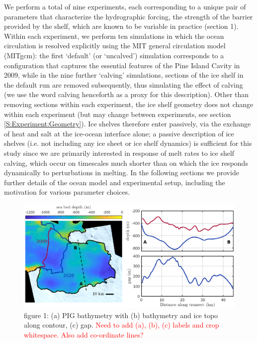 \documentclass[draft]{agujournal2019}
\newcommand{\red}[1]{\textcolor{red}{#1}}
\begin{document}
We perform a total of nine experiments, each corresponding to a unique pair of parameters that characterize the hydrographic forcing, the strength of the barrier provided by the shelf, which are known to be variable in practice (section 1). Within each experiment, we perform ten simulations in which the ocean circulation is resolved explicitly using the MIT general circulation model (MITgcm): the first `default' (or `uncalved') simulation  corresponds to a configuration that captures the essential features of the Pine Island Cavity in 2009, while in the nine further `calving' simulations, sections of the ice shelf in the default run are removed subsequently, thus simulating the effect of calving (we use the word calving henceforth as a proxy for this description). Other than removing sections within each experiment, the ice shelf geometry does not change within each experiment (but may change between experiments, see section \ref{S:Experiment:Geometry}). Ice shelves therefore enter passively, via the exchange of heat and salt at the ice-ocean interface alone; a passive description of ice shelves (i.e. not including any ice sheet or ice shelf dynamics) is sufficient for this study since we are primarily interested in response of melt rates to ice shelf calving, which occur on timescales much shorter than on which the ice responds dynamically to perturbations in melting. In the following sections we provide further details of the ocean model and experimental setup, including the motivation for various parameter choices.
\begin{figure}
    \centering
    \includegraphics[width = \textwidth]{../make_figures/plots/figure1.eps}
    \caption{figure 1: (a) PIG bathymetry with (b) bathymetry and ice topo along contour, (c) gap. \red{Need to add (a), (b), (c) labels and crop whitespace. Also add co-ordinate lines?}}
    \label{fig:my_label}
\end{figure}
\end{document}
